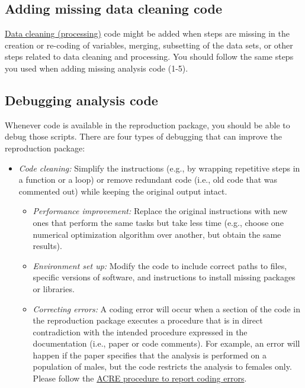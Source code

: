 \documentclass[]{book}
\providecommand{\tightlist}{%
  \setlength{\itemsep}{0pt}\setlength{\parskip}{0pt}}
\begin{document}
\hypertarget{cc}{%
\subsection{Adding missing data cleaning code}\label{cc}}

\protect\hyperlink{describe-inputs}{Data cleaning (processing)} code might be added when steps are missing in the creation or re-coding of variables, merging, subsetting of the data sets, or other steps related to data cleaning and processing. You should follow the same steps you used when adding missing analysis code (1-5).

\hypertarget{dac}{%
\subsection{Debugging analysis code}\label{dac}}

Whenever code is available in the reproduction package, you should be able to debug those scripts. There are four types of debugging that can improve the reproduction package:

\begin{itemize}
\tightlist
\item
  \emph{Code cleaning:} Simplify the instructions (e.g., by wrapping repetitive steps in a function or a loop) or remove redundant code (i.e., old code that was commented out) while keeping the original output intact.

  \begin{itemize}
  \tightlist
  \item
    \emph{Performance improvement:} Replace the original instructions with new ones that perform the same tasks but take less time (e.g., choose one numerical optimization algorithm over another, but obtain the same results).\\
  \item
    \emph{Environment set up:} Modify the code to include correct paths to files, specific versions of software, and instructions to install missing packages or libraries.\\
  \item
    \emph{Correcting errors:} A coding error will occur when a section of the code in the reproduction package executes a procedure that is in direct contradiction with the intended procedure expressed in the documentation (i.e., paper or code comments). For example, an error will happen if the paper specifies that the analysis is performed on a population of males, but the code restricts the analysis to females only. Please follow the \href{ADD\%20LINK}{ACRE procedure to report coding errors}.
  \end{itemize}
\end{itemize}
\end{document}
